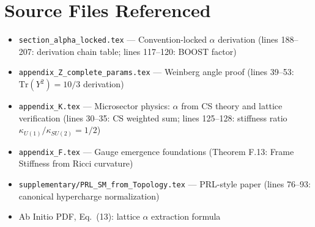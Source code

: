 \documentclass[11pt]{article}
\begin{document}
\section{Source Files Referenced}

\begin{itemize}
\item \texttt{section\_alpha\_locked.tex} --- Convention-locked $\alpha$ derivation
      (lines 188--207: derivation chain table; lines 117--120: BOOST factor)
\item \texttt{appendix\_Z\_complete\_params.tex} --- Weinberg angle proof
      (lines 39--53: $\mathrm{Tr}(Y^2) = 10/3$ derivation)
\item \texttt{appendix\_K.tex} --- Microsector physics: $\alpha$ from CS theory
      and lattice verification (lines 30--35: CS weighted sum; lines 125--128:
      stiffness ratio $\kappa_{U(1)}/\kappa_{SU(2)} = 1/2$)
\item \texttt{appendix\_F.tex} --- Gauge emergence foundations
      (Theorem F.13: Frame Stiffness from Ricci curvature)
\item \texttt{supplementary/PRL\_SM\_from\_Topology.tex} --- PRL-style paper
      (lines 76--93: canonical hypercharge normalization)
\item Ab Initio PDF, Eq.~(13): lattice $\alpha$ extraction formula
\end{itemize}
\end{document}
